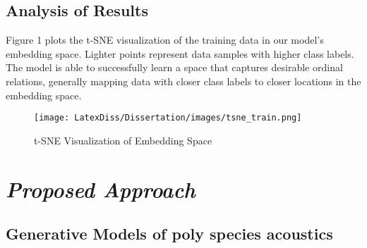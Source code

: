 
\subsection{Analysis of Results}

Figure 1 plots the t-SNE visualization of the training data in our model's embedding space. Lighter points represent data samples with higher class labels. The model is able to successfully learn a space that captures desirable ordinal relations, generally mapping data with closer class labels to closer locations in the embedding space.

\begin{figure}[h]
\centering
\texttt{[image: LatexDiss/Dissertation/images/tsne\_train.png]}
\caption{ t-SNE Visualization of Embedding Space} 
\label{frame_replacement_overview}
\end{figure}  



\section{\textit{Proposed Approach}}
\label{proposed_approach}

\subsection{Generative Models of poly species acoustics}


